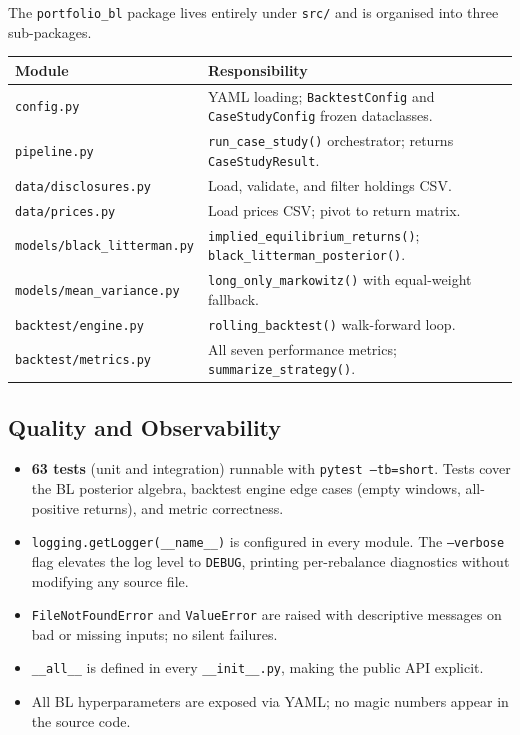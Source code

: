 \documentclass[11pt, a4paper]{article}
\newcommand{\code}[1]{\texttt{#1}}
\begin{document}
The \code{portfolio\_bl} package lives entirely under \code{src/} and is
organised into three sub-packages.

\medskip
\begin{center}
\begin{tabular}{@{}L{5.8cm} L{7.3cm}@{}}
  \toprule
  \textbf{Module} & \textbf{Responsibility} \\
  \midrule
  \code{config.py}                    & YAML loading; \code{BacktestConfig} and
                                        \code{CaseStudyConfig} frozen dataclasses. \\
  \code{pipeline.py}                  & \code{run\_case\_study()} orchestrator;
                                        returns \code{CaseStudyResult}. \\
  \code{data/disclosures.py}          & Load, validate, and filter holdings CSV. \\
  \code{data/prices.py}               & Load prices CSV; pivot to return matrix. \\
  \code{models/black\_litterman.py}   & \code{implied\_equilibrium\_returns()};
                                        \code{black\_litterman\_posterior()}. \\
  \code{models/mean\_variance.py}     & \code{long\_only\_markowitz()} with
                                        equal-weight fallback. \\
  \code{backtest/engine.py}           & \code{rolling\_backtest()} walk-forward loop. \\
  \code{backtest/metrics.py}          & All seven performance metrics;
                                        \code{summarize\_strategy()}. \\
  \bottomrule
\end{tabular}
\end{center}

\subsection{Quality and Observability}

\begin{itemize}
  \item \textbf{63 tests} (unit and integration) runnable with
        \code{pytest --tb=short}. Tests cover the BL posterior algebra,
        backtest engine edge cases (empty windows, all-positive returns),
        and metric correctness.
  \item \code{logging.getLogger(\_\_name\_\_)} is configured in every module.
        The \code{--verbose} flag elevates the log level to \code{DEBUG},
        printing per-rebalance diagnostics without modifying any source file.
  \item \code{FileNotFoundError} and \code{ValueError} are raised with
        descriptive messages on bad or missing inputs; no silent failures.
  \item \code{\_\_all\_\_} is defined in every \code{\_\_init\_\_.py},
        making the public API explicit.
  \item All BL hyperparameters are exposed via YAML; no magic numbers
        appear in the source code.
\end{itemize}
\end{document}
